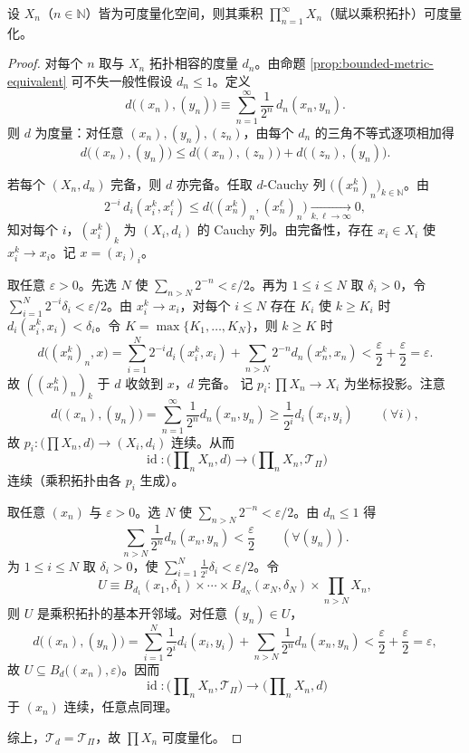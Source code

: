\documentclass[lang=cn,a4paper,newtx,figureplace=section,tableplace=section]{elegantbook}
\begin{document}
 \begin{lemma}[可数积的度量化]\label{lem:countable-product-metrizable}
  设 $X_n$（$n\in\mathbb N$）皆为可度量化空间，则其乘积 $\prod_{n=1}^{\infty}X_n$（赋以乘积拓扑）可度量化。
 \end{lemma}
 \begin{proof}
  对每个 $n$ 取与 $X_n$ 拓扑相容的度量 $d_n$。由命题 \ref{prop:bounded-metric-equivalent} 可不失一般性假设 $d_n\le1$。定义
  \[
   d\big((x_n),(y_n)\big)\equiv \sum_{n=1}^{\infty}\frac{1}{2^n}\,d_n(x_n,y_n).
  \]
  则 $d$ 为度量：对任意 $(x_n),(y_n),(z_n)$，由每个 $d_n$ 的三角不等式逐项相加得
  \[
   d\big((x_n),(y_n)\big)\le d\big((x_n),(z_n)\big)+d\big((z_n),(y_n)\big).
  \]

    若每个 $(X_n,d_n)$ 完备，则 $d$ 亦完备。任取 $d$-Cauchy 列 $\big((x_n^k)_n\big)_{k\in\mathbb N}$。由
  \[
   2^{-i}\,d_i(x_i^k,x_i^\ell)\le d\big((x_n^k)_n,(x_n^\ell)_n\big)\xrightarrow[k,\ell\to\infty]{}0,
  \]
  知对每个 $i$，$(x_i^k)_k$ 为 $(X_i,d_i)$ 的 Cauchy 列。由完备性，存在 $x_i\in X_i$ 使 $x_i^k\to x_i$。记 $x=(x_i)_i$。
  
  取任意 $\varepsilon>0$。先选 $N$ 使 $\sum_{n>N}2^{-n}<\varepsilon/2$。再为 $1\le i\le N$ 取 $\delta_i>0$，令 $\sum_{i=1}^N2^{-i}\delta_i<\varepsilon/2$。由 $x_i^k\to x_i$，对每个 $i\le N$ 存在 $K_i$ 使 $k\ge K_i$ 时 $d_i(x_i^k,x_i)<\delta_i$。令 $K=\max\{K_1,\dots,K_N\}$，则 $k\ge K$ 时
  \[
   d\big((x_n^k)_n,x\big)=\sum_{i=1}^{N}2^{-i}d_i(x_i^k,x_i)+\sum_{n>N}2^{-n}d_n(x_n^k,x_n)<\frac{\varepsilon}{2}+\frac{\varepsilon}{2}=\varepsilon.
  \]
  故 $((x_n^k)_n)_k$ 于 $d$ 收敛到 $x$，$d$ 完备。
  记 $p_i:\prod X_n\to X_i$ 为坐标投影。注意
  \[
   d\big((x_n),(y_n)\big)=\sum_{n=1}^{\infty}\frac{1}{2^n}d_n(x_n,y_n)\ge \frac{1}{2^i}d_i(x_i,y_i)\qquad(\forall i),
  \]
  故 $p_i:\big(\prod X_n,d\big)\to (X_i,d_i)$ 连续。从而
  \[
   \operatorname{id}:\big(\prod\nolimits_{n}X_n,d\big)\longrightarrow \big(\prod\nolimits_{n}X_n,\mathcal T_{\Pi}\big)
  \]
  连续（乘积拓扑由各 $p_i$ 生成）。
  
  取任意 $(x_n)$ 与 $\varepsilon>0$。选 $N$ 使 $\sum_{n>N}2^{-n}<\varepsilon/2$。由 $d_n\le1$ 得
  \[
   \sum_{n>N}\frac{1}{2^n}d_n(x_n,y_n)<\frac{\varepsilon}{2}\qquad(\forall (y_n)).
  \]
  为 $1\le i\le N$ 取 $\delta_i>0$，使 $\sum_{i=1}^{N}\tfrac{1}{2^i}\delta_i<\varepsilon/2$。令
  \[
   U\equiv B_{d_1}(x_1,\delta_1)\times\cdots\times B_{d_N}(x_N,\delta_N)\times\prod_{n>N}X_n,
  \]
  则 $U$ 是乘积拓扑的基本开邻域。对任意 $(y_n)\in U$，
  \[
   d\big((x_n),(y_n)\big)=\sum_{i=1}^{N}\frac{1}{2^i}d_i(x_i,y_i)+\sum_{n>N}\frac{1}{2^n}d_n(x_n,y_n)<\frac{\varepsilon}{2}+\frac{\varepsilon}{2}=\varepsilon,
  \]
  故 $U\subseteq B_d\big((x_n),\varepsilon\big)$。因而
  \[
   \operatorname{id}:\big(\prod\nolimits_{n}X_n,\mathcal T_{\Pi}\big)\longrightarrow \big(\prod\nolimits_{n}X_n,d\big)
  \]
  于 $(x_n)$ 连续，任意点同理。
  
  综上，$\mathcal T_d=\mathcal T_{\Pi}$，故 $\prod X_n$ 可度量化。
  
  
 \end{proof}
 
\end{document}
